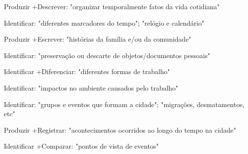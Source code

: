 Produzir +Descrever: "organizar temporalmente fatos da vida cotidiana"

 Identificar: "diferentes marcadores do tempo"; "relógio e calendário"

 Produzir +Escrever: "histórias da família e/ou da comunidade"

 Identificar: "preservação ou descarte de objetos/documentos pessoais"

 Identificar +Diferenciar: "diferentes formas de trabalho"

 Identificar: "impactos no ambiente causados pelo trabalho"

 Identificar: "grupos e eventos que formam a cidade"; "migrações, desmatamentos, etc"

 Produzir +Registrar: "acontecimentos ocorridos ao longo do tempo na cidade"

 Identificar +Comparar: "pontos de vista de eventos"

